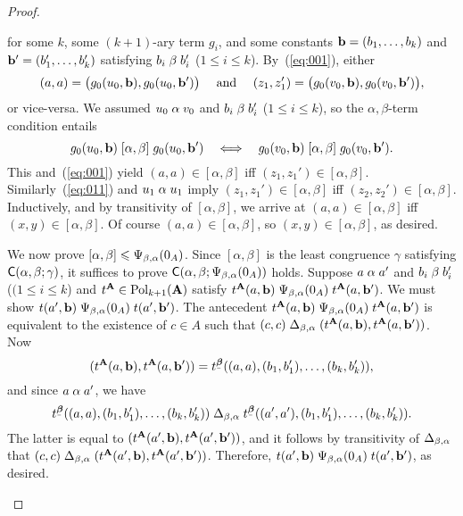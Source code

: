 \begin{proof}
\begin{enumerate}[(i)]
    \renewcommand\gA{\ensuremath{g}}%
    for some $k$, some $(k+1)$-ary term $\gA_i$, and some constants
    $\mathbf{b} = (b_1, \dots, b_k)$ and $\mathbf{b}' = (b_1', \dots, b_k')$ satisfying
    $b_i \mathrel{\beta} b_i'$ ($1\leq i\leq k$). 
    By~(\ref{eq:001}), either
    \[
    (a, a) = \bigl(\gA_0(u_0, \bb), \gA_0(u_0, \bb')\bigr)
    \quad \text{ and } \quad 
    (z_1,z_1')= \bigl(\gA_0(v_0, \bb), \gA_0(v_0, \bb')\bigr),
    \]
    or vice-versa. %
    We assumed $u_0 \mathrel{\alpha} v_0$ and $b_i \mathrel{\beta} b_i'$ ($1\leq i\leq k$),
    so the $\alpha,\beta$-term condition entails
    \[
    \gA_0(u_0, \bb) \commr{\alpha}{\beta} \gA_0(u_0, \bb')
    \quad \Longleftrightarrow \quad 
    \gA_0(v_0, \bb) \commr{\alpha}{\beta} \gA_0(v_0, \bb').
    \]
    This and~(\ref{eq:001}) yield
    $(a,a)\in [\alpha, \beta]$ iff
    $(z_1,z_1')\in [\alpha, \beta]$.
    Similarly~(\ref{eq:011}) and $u_1 \mathrel{\alpha} u_1$ imply
    $(z_1,z_1')\in [\alpha, \beta]$ iff
    $(z_2,z_2')\in [\alpha, \beta]$.  Inductively, and by transitivity of
    $[\alpha, \beta]$, we arrive at $(a,a)\in [\alpha, \beta]$ iff
    $(x,y)\in [\alpha, \beta]$.
    Of course 
    $(a,a)\in [\alpha, \beta]$, so $(x,y)\in [\alpha, \beta]$, as desired.

    We now prove $[\alpha, \beta]\leqslant \Psi_{\beta, \alpha}(0_A)$.
    Since $[\alpha, \beta]$ is the least congruence $\gamma$
    satisfying $\mathsf{C}(\alpha, \beta; \gamma)$, it suffices to prove
    $\mathsf{C}(\alpha, \beta; \Psi_{\beta, \alpha}(0_A))$ holds.
    Suppose $a \mathrel{\alpha} a'$ and $b_i \mathrel{\beta} b_i'$ ($(1\leq i \leq k$) and
    $t^{\mathbf{A}} \in \operatorname{Pol}_{k+1}(\mathbf{A})$ satisfy
    $t^{\mathbf{A}}(a, \mathbf{b}) \mathrel{\Psi_{\beta, \alpha}(0_A)} t^{\mathbf{A}}(a, \mathbf{b}')$.  
    We must show $t(a', \mathbf{b}) \mathrel{\Psi_{\beta, \alpha}(0_A)} t(a', \mathbf{b}')$.  
    The antecedent $t^{\mathbf{A}}(a, \mathbf{b}) \mathrel{\Psi_{\beta, \alpha}(0_A)} t^{\mathbf{A}}(a, \mathbf{b}')$ is equivalent to
    the existence of $c \in A$ such that $(c,c) \mathrel{\Delta_{\beta, \alpha}} (t^{\mathbf{A}}(a, \mathbf{b}), t^{\mathbf{A}}(a, \mathbf{b}'))$.
    Now
    \[
    (t^{\bA}(a, \bb), t^{\bA}(a, \bb')) = t^{\bbeta}((a,a),(b_1, b_1'), \dots,(b_k, b_k')),
    \]
    and since $a \mathrel{\alpha} a'$, we have
    \[
    t^{\bbeta}((a,a),(b_1, b_1'), \dots,(b_k, b_k'))
    \Deltabar
    t^{\bbeta}((a',a'),(b_1, b_1'), \dots,(b_k, b_k')).
    \]
    The latter is equal to $(t^{\mathbf{A}}(a', \mathbf{b}), t^{\mathbf{A}}(a', \mathbf{b}'))$, and  it follows
    by transitivity of $\Delta_{\beta, \alpha}$ that
    $(c,c) \mathrel{\Delta_{\beta, \alpha}} (t^{\mathbf{A}}(a', \mathbf{b}), t^{\mathbf{A}}(a', \mathbf{b}'))$.
    Therefore, $t(a', \mathbf{b}) \mathrel{\Psi_{\beta, \alpha}(0_A)} t(a', \mathbf{b}')$, as desired.  
  \end{enumerate}
\end{proof}

